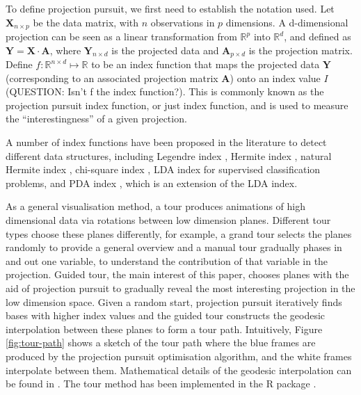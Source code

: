 To define projection pursuit, we first need to establish the notation
used. Let \(\mathbf{X}_{n \times p}\) be the data matrix, with \(n\)
observations in \(p\) dimensions. A d-dimensional projection can be seen
as a linear transformation from \(\mathbb{R}^p\) into \(\mathbb{R}^d\),
and defined as \(\mathbf{Y} = \mathbf{X} \cdot \mathbf{A}\), where
\(\mathbf{Y}_{n \times d}\) is the projected data and
\(\mathbf{A}_{p\times d}\) is the projection matrix. Define
\(f: \mathbb{R}^{n \times d} \mapsto \mathbb{R}\) to be an index
function that maps the projected data \(\mathbf{Y}\) (corresponding to
an associated projection matrix \(\mathbf{A}\)) onto an index value
\(I\) (QUESTION: Isn't f the index function?). This is commonly known as
the projection pursuit index function, or just index function, and is
used to measure the ``interestingness'' of a given projection.

A number of index functions have been proposed in the literature to
detect different data structures, including Legendre index
\citep{friedman1974projection}, Hermite index
\citep{hall1989polynomial}, natural Hermite index
\citep{cook1993projection}, chi-square index
\citep{posse1995projection}, LDA index \citep{lee2005projection} for
supervised classification problems, and PDA index
\citep{lee2010projection}, which is an extension of the LDA index.

As a general visualisation method, a tour produces animations of high
dimensional data via rotations between low dimension planes. Different
tour types choose these planes differently, for example, a grand tour
\citep{cook2008grand} selects the planes randomly to provide a general
overview and a manual tour \citep{cook1997manual} gradually phases in
and out one variable, to understand the contribution of that variable in
the projection. Guided tour, the main interest of this paper, chooses
planes with the aid of projection pursuit to gradually reveal the most
interesting projection in the low dimension space. Given a random start,
projection pursuit iteratively finds bases with higher index values and
the guided tour constructs the geodesic interpolation between these
planes to form a tour path. Intuitively, Figure \ref{fig:tour-path}
shows a sketch of the tour path where the blue frames are produced by
the projection pursuit optimisation algorithm, and the white frames
interpolate between them. Mathematical details of the geodesic
interpolation can be found in \citet{buja2005computational}. The tour
method has been implemented in the R package 
\citep{tourr}.

